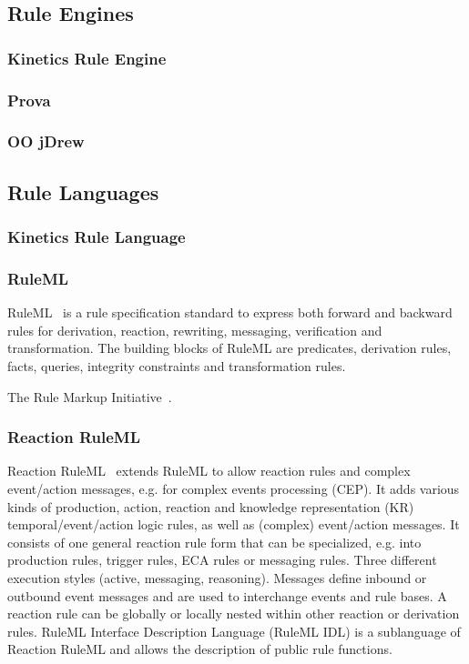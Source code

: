 \documentclass[11pt,twocolumn]{article}
\begin{document}
\subsection{Rule Engines}

\subsubsection{Kinetics Rule Engine}


\subsubsection{Prova}


\subsubsection{OO jDrew}



\subsection{Rule Languages}
\subsubsection{Kinetics Rule Language}


\subsubsection{RuleML}
RuleML~\cite{2006-Boley-RuleML.pdf} is a rule specification standard to express both forward and backward rules for derivation, reaction, rewriting, messaging, verification and transformation. The building blocks of RuleML are predicates, derivation rules, facts, queries, integrity constraints and transformation rules.

The Rule Markup Initiative~\cite{wwwruleml}.


\subsubsection{Reaction RuleML}
Reaction RuleML~\cite{2012-Paschke_etal-ReactionRuleML.pdf} extends RuleML to allow reaction rules and complex event/action messages, e.g. for complex events processing (CEP). It adds various kinds of production, action, reaction and knowledge representation (KR) temporal/event/action logic rules, as well as (complex) event/action messages. It consists of one general reaction rule form that can be specialized, e.g. into production rules, trigger rules, ECA rules or messaging rules. Three different execution styles (active, messaging,  reasoning). Messages define inbound or outbound event messages and are used to interchange events and rule bases. A reaction rule can be globally or locally nested within other reaction or derivation rules.
RuleML Interface Description Language (RuleML IDL) is a sublanguage of Reaction RuleML and allows the description of public rule functions.
\end{document}
